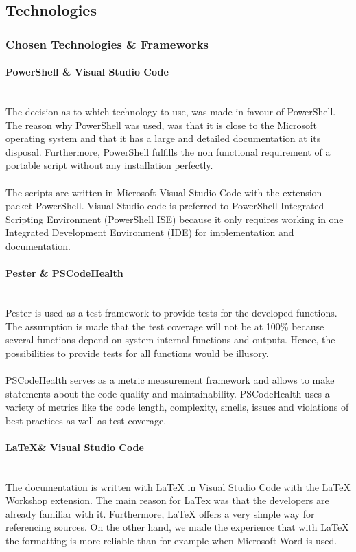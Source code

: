 \clearpage

\subsection{Technologies}
\subsubsection{Chosen Technologies \& Frameworks}
\paragraph{PowerShell \& Visual Studio Code} \ \\
The decision as to which technology to use, was made in favour of PowerShell. The reason why PowerShell was used, was that it is close to the Microsoft operating system and that it has a large and detailed documentation at its disposal. Furthermore, PowerShell fulfills the non functional requirement of a portable script without any installation perfectly.\ \\
\ \\
The scripts are written in Microsoft Visual Studio Code \cite{VSCode} with the extension packet PowerShell. Visual Studio code is preferred to PowerShell Integrated Scripting Environment (PowerShell ISE) because it only requires working in one Integrated Development Environment (IDE) for implementation and documentation.

\paragraph{Pester \& PSCodeHealth} \ \\
Pester \cite{Pester} is used as a test framework to provide tests for the developed functions. The assumption is made that the test coverage will not be at 100\% because several functions depend on system internal functions and outputs. Hence, the possibilities to provide tests for all functions would be illusory. 
\\\\
PSCodeHealth \cite{PSCodeHealth} serves as a metric measurement framework and allows to make statements about the code quality and maintainability. PSCodeHealth uses a variety of metrics like the code length, complexity, smells, issues and violations of best practices as well as test coverage. 

\paragraph{\LaTeX \& Visual Studio Code}\ \\
The documentation is written with LaTeX in Visual Studio Code with the LaTeX Workshop extension. The main reason for LaTex was that the developers are already familiar with it. Furthermore, LaTeX offers a very simple way for referencing sources. On the other hand, we made the experience that with LaTeX the formatting is more reliable than for example when Microsoft Word is used.

